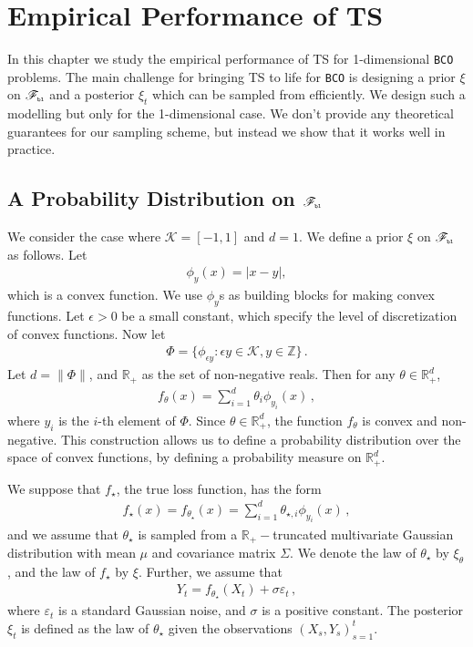 \documentclass[letter, 12pt]{report}
\newcommand{\pb}{\text{\tiny\texttt{b}}}
\newcommand{\pl}{\text{\tiny\texttt{l}}}
\newcommand{\R}{\mathbb R}
\newcommand{\abs}[1]{\left| #1 \right|}
\newcommand{\cK}{\mathcal K}
\newcommand{\sF}{\mathscr F}
\newcommand{\1}{\mathbf{1}}
\newcommand{\bco}{\texttt{BCO}\xspace}
\newcommand{\ts}{\textsc{TS}\xspace}
\theoremstyle{plain}
\theoremstyle{definition}
\theoremstyle{remark}
\begin{document}
\chapter{Empirical Performance of \ts}
In this chapter we study the empirical performance of \ts
for 1-dimensional \bco problems.
The main challenge for bringing \ts to life
for \bco is designing a prior $\xi$ on $\sF_{\pb\pl}$
and a posterior $\xi_t$ which can be sampled from efficiently.
We design such a modelling but only for the 1-dimensional case.
We don't provide any theoretical guarantees for our sampling
scheme, but instead we show that it works well in practice.

\section{A Probability Distribution on $\sF_{\pb\pl}$}
\label{sec:ts-empirical}
We consider the case where $\cK = [-1, 1]$ and $d = 1$.
We define a prior $\xi$ on $\sF_{\pb\pl}$ as follows.
Let
\begin{align*}
    \phi_{y}(x) = \abs{x - y},
\end{align*}
which is a convex function.
We use $\phi_y$s as building blocks for making convex functions.
Let $\epsilon > 0$ be a small constant, which specify the level of discretization of convex functions.
Now let
\begin{align}
    \Phi = \{ \phi_{\epsilon y} : \epsilon y \in \cK, y \in \mathbb{Z}\}\,.
\end{align}
Let $d = \|\Phi\|$, and $\R_+$ as the set of non-negative reals.
Then for any $\theta \in \R_+^d$,
\begin{align*}
    f_\theta(x) = \sum_{i=1}^d \theta_i \phi_{y_i}(x)\,,
\end{align*}
where $y_i$ is the $i$-th element of $\Phi$.
Since $\theta \in \R_+^d$, the function $f_\theta$ is convex and non-negative.
This construction allows us to define a probability distribution over the space of convex functions,
by defining a probability measure on $\R_+^d$.

We suppose that $f_\star$, the true loss function, has the form
\begin{align}
    f_\star(x) = f_{\theta_\star}(x) = \sum_{i=1}^d \theta_{\star,i} \phi_{y_i}(x)\,,
\end{align}
and we assume that $\theta_\star$ is sampled from
a $\R_+-$truncated multivariate Gaussian distribution
with mean $\mu$ and covariance matrix $\Sigma$.
We denote the law of $\theta_\star$ by $\xi_\theta$,
and the law of $f_\star$ by $\xi$.
Further, we assume that
\begin{align}
    Y_t = f_{\theta_\star}(X_t) + \sigma \varepsilon_t\,,
\end{align}
where $\varepsilon_t$ is a standard Gaussian noise,
and $\sigma$ is a positive constant.
The posterior $\xi_t$ is defined as the law of $\theta_\star$ given the
observations $(X_s, Y_s)_{s=1}^t$.
\end{document}
